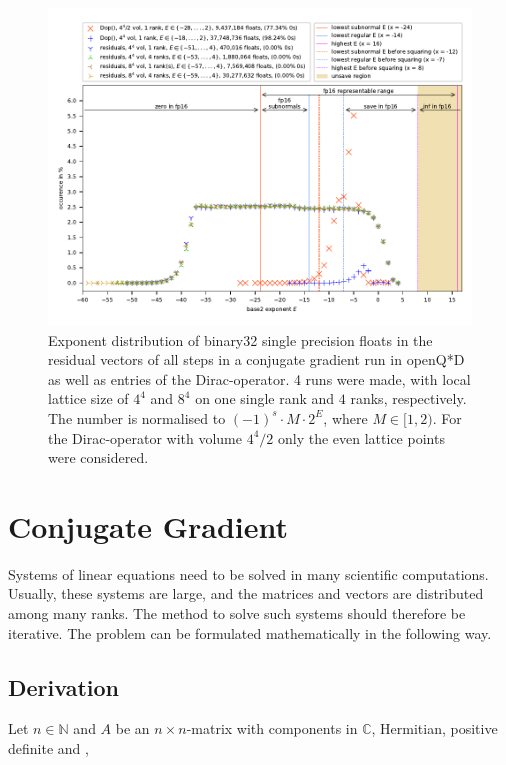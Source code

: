 \documentclass{article}
\theoremstyle{plain} %
\theoremstyle{convention} %
\theoremstyle{remark} %
\numberwithin{equation}{section}
\begin{document}
\begin{figure}
    \centering
    \includegraphics[width=1.0\textwidth]{plots/exponents_dirac}
    \caption{Exponent distribution of \gls{binary32} single precision floats in the residual vectors of all steps in a conjugate gradient run in openQ*D as well as entries of the Dirac-operator. 4 runs were made, with local lattice size of $4^4$ and $8^4$ on one single rank and $4$ ranks, respectively. The number is normalised to $(-1)^s \cdot M \cdot 2^{E}$, where $M \in [1, 2)$. For the Dirac-operator with volume $4^4/2$ only the even lattice points were considered.}
    \label{fig:exponents}
\end{figure}


\section{Conjugate Gradient}

\label{sec:cg}

Systems of linear equations need to be solved in many scientific computations. Usually, these systems are large, and the matrices and vectors are distributed among many \glspl{rank}. The method to solve such systems should therefore be iterative. The problem can be formulated mathematically in the following way.

\subsection{Derivation}

Let $n \in \mathbb{N}$ and $A$ be an $n \times n$-matrix with components in $\mathbb{C}$, Hermitian, positive definite and ,
\end{document}
